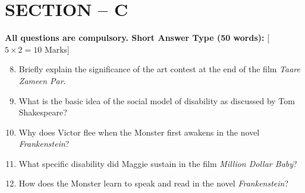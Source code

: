 \documentclass[11pt,a4paper]{article}
\begin{document}
\section*{SECTION -- C}



\noindent   \textbf{All questions are compulsory. Short Answer Type (50 words):} \hfill [$5  \times 2 = 10$ Marks]


\begin{enumerate}[label=   \textbf{\arabic*.}]
    \setcounter{enumii}{7}
    \item Briefly explain the significance of the art contest at the end of the film   \textit{Taare Zameen Par}.
    \item What is the basic idea of the social model of disability as discussed by Tom Shakespeare?
    \item Why does Victor flee when the Monster first awakens in the novel   \textit{Frankenstein}?
    \item What specific disability did Maggie sustain in the film   \textit{Million Dollar Baby}?
    \item How does the Monster learn to speak and read in the novel   \textit{Frankenstein}?
\end{enumerate}
\end{document}
